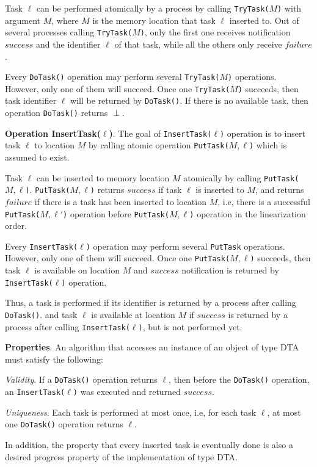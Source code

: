 Task $\ell$ can be performed atomically by a process by calling \texttt{TryTask(}$M$\texttt{)}
with argument $M$, where $M$ is the memory location that task $\ell$ inserted to. Out of several processes
calling \texttt{TryTask(}$M$\texttt{)}, only the first one receives notification $success$ and the identifier $\ell$ of
that task, while all the others only receive $failure$.

Every \texttt{DoTask()} operation may perform several \texttt{TryTask(}$M$\texttt{)}
operations. However, only one of them will succeed. Once one \texttt{TryTask(}$M$\texttt{)} succeeds, then
task identifier $\ell$ will be returned by \texttt{DoTask()}.
If there is no available task, then operation \texttt{DoTask()} returns $\perp$.

\textbf{Operation InsertTask($\ell$)}.
The goal of \texttt{InsertTask(}$\ell$\texttt{)} operation is to insert task $\ell$ to location $M$
by calling atomic operation \texttt{PutTask(}$M,\ell$\texttt{)} which is assumed to exist.

Task $\ell$ can be inserted to memory location $M$ atomically by calling \texttt{PutTask(}$M,\ell$\texttt{)}.
\texttt{PutTask(}$M,\ell$\texttt{)} returns $success$ if task $\ell$ is inserted to $M$,
and returns $failure$ if there is a task has been inserted to location $M$, i.e, there is a successful \texttt{PutTask(}$M,\ell'$\texttt{)} operation
before \texttt{PutTask(}$M,\ell$\texttt{)} operation in the linearization order.


Every \texttt{InsertTask(}$\ell$\texttt{)} operation may perform several \texttt{PutTask} operations.
However, only one of them will succeed. Once one \texttt{PutTask(}$M,\ell$\texttt{)} succeeds, then task $\ell$ is available on location $M$ and $success$
notification is returned by \texttt{InsertTask(}$\ell$\texttt{)} operation.

Thus, a task is performed if its identifier is returned by a process after calling \texttt{DoTask()}.
and task $\ell$ is available at location $M$ if $success$ is returned by a process
after calling \texttt{InsertTask(}$\ell$\texttt{)}, but is not performed yet.

\textbf{Properties}.
An algorithm that accesses an instance of an object of type DTA must satisfy the following:

\emph{Validity}. If a \texttt{DoTask()} operation returns $\ell$, then before the
\texttt{DoTask()} operation, an \texttt{InsertTask(}$\ell$\texttt{)} was executed and returned $success$.

\emph{Uniqueness}. Each task is performed at most once, i.e, for each task $\ell$, at most one \texttt{DoTask()}
operation returns $\ell$.

In addition, the property that every inserted task is eventually done is also a desired progress property
of the implementation of type DTA.
